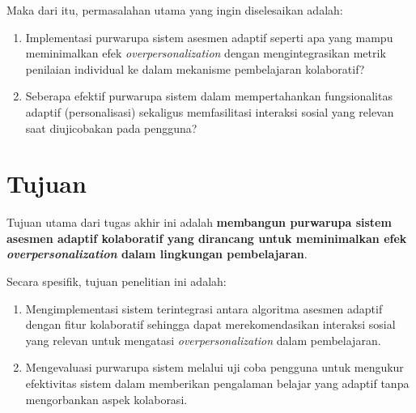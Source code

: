 Maka dari itu, permasalahan utama yang ingin diselesaikan adalah:
\begin{enumerate}
  \item Implementasi purwarupa sistem
  asesmen adaptif seperti apa yang mampu meminimalkan efek
  \textit{overpersonalization} dengan mengintegrasikan metrik penilaian
  individual ke dalam mekanisme pembelajaran kolaboratif?
  \item Seberapa efektif purwarupa sistem dalam mempertahankan
  fungsionalitas adaptif (personalisasi) sekaligus memfasilitasi
  interaksi
  sosial yang relevan saat diujicobakan pada pengguna?
\end{enumerate}


\section{Tujuan}
\label{sec:tujuan}
Tujuan utama dari tugas akhir ini adalah \textbf{membangun purwarupa sistem
asesmen adaptif kolaboratif yang dirancang untuk meminimalkan efek
\textit{overpersonalization} dalam lingkungan pembelajaran}.

Secara spesifik, tujuan penelitian ini adalah:
\begin{enumerate}
  \item Mengimplementasi sistem terintegrasi antara algoritma asesmen adaptif
  dengan fitur kolaboratif sehingga
  dapat merekomendasikan interaksi sosial yang relevan untuk
  mengatasi \textit{overpersonalization} dalam pembelajaran.
  \item Mengevaluasi purwarupa sistem melalui uji coba pengguna untuk mengukur
  efektivitas sistem dalam memberikan pengalaman belajar yang adaptif tanpa
  mengorbankan aspek kolaborasi.
\end{enumerate}

